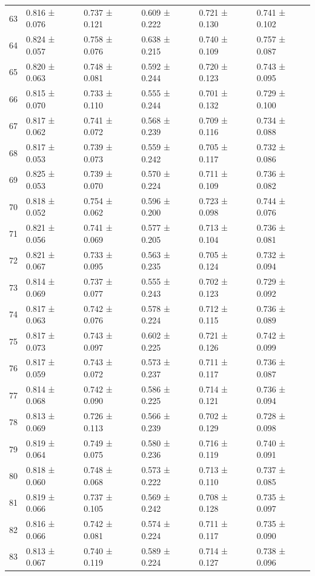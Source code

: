 \begin{tabular}{llllll}
63 & 0.816 ± 0.076 & 0.737 ± 0.121 & 0.609 ± 0.222 & 0.721 ± 0.130 & 0.741 ± 0.102 \\
64 & 0.824 ± 0.057 & 0.758 ± 0.076 & 0.638 ± 0.215 & 0.740 ± 0.109 & 0.757 ± 0.087 \\
65 & 0.820 ± 0.063 & 0.748 ± 0.081 & 0.592 ± 0.244 & 0.720 ± 0.123 & 0.743 ± 0.095 \\
66 & 0.815 ± 0.070 & 0.733 ± 0.110 & 0.555 ± 0.244 & 0.701 ± 0.132 & 0.729 ± 0.100 \\
67 & 0.817 ± 0.062 & 0.741 ± 0.072 & 0.568 ± 0.239 & 0.709 ± 0.116 & 0.734 ± 0.088 \\
68 & 0.817 ± 0.053 & 0.739 ± 0.073 & 0.559 ± 0.242 & 0.705 ± 0.117 & 0.732 ± 0.086 \\
69 & 0.825 ± 0.053 & 0.739 ± 0.070 & 0.570 ± 0.224 & 0.711 ± 0.109 & 0.736 ± 0.082 \\
70 & 0.818 ± 0.052 & 0.754 ± 0.062 & 0.596 ± 0.200 & 0.723 ± 0.098 & 0.744 ± 0.076 \\
71 & 0.821 ± 0.056 & 0.741 ± 0.069 & 0.577 ± 0.205 & 0.713 ± 0.104 & 0.736 ± 0.081 \\
72 & 0.821 ± 0.067 & 0.733 ± 0.095 & 0.563 ± 0.235 & 0.705 ± 0.124 & 0.732 ± 0.094 \\
73 & 0.814 ± 0.069 & 0.737 ± 0.077 & 0.555 ± 0.243 & 0.702 ± 0.123 & 0.729 ± 0.092 \\
74 & 0.817 ± 0.063 & 0.742 ± 0.076 & 0.578 ± 0.224 & 0.712 ± 0.115 & 0.736 ± 0.089 \\
75 & 0.817 ± 0.073 & 0.743 ± 0.097 & 0.602 ± 0.225 & 0.721 ± 0.126 & 0.742 ± 0.099 \\
76 & 0.817 ± 0.059 & 0.743 ± 0.072 & 0.573 ± 0.237 & 0.711 ± 0.117 & 0.736 ± 0.087 \\
77 & 0.814 ± 0.068 & 0.742 ± 0.090 & 0.586 ± 0.225 & 0.714 ± 0.121 & 0.736 ± 0.094 \\
78 & 0.813 ± 0.069 & 0.726 ± 0.113 & 0.566 ± 0.239 & 0.702 ± 0.129 & 0.728 ± 0.098 \\
79 & 0.819 ± 0.064 & 0.749 ± 0.075 & 0.580 ± 0.236 & 0.716 ± 0.119 & 0.740 ± 0.091 \\
80 & 0.818 ± 0.060 & 0.748 ± 0.068 & 0.573 ± 0.222 & 0.713 ± 0.110 & 0.737 ± 0.085 \\
81 & 0.819 ± 0.066 & 0.737 ± 0.105 & 0.569 ± 0.242 & 0.708 ± 0.128 & 0.735 ± 0.097 \\
82 & 0.816 ± 0.066 & 0.742 ± 0.081 & 0.574 ± 0.224 & 0.711 ± 0.117 & 0.735 ± 0.090 \\
83 & 0.813 ± 0.067 & 0.740 ± 0.119 & 0.589 ± 0.224 & 0.714 ± 0.127 & 0.738 ± 0.096 \\

\end{tabular}

